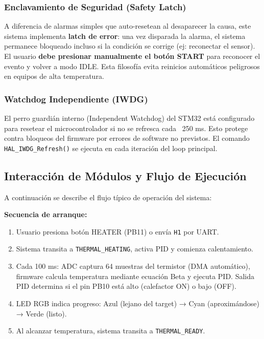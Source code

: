 \documentclass[12pt]{article}
\begin{document}
\subsubsection{Enclavamiento de Seguridad (Safety Latch)}
A diferencia de alarmas simples que auto-resetean al desaparecer la causa, este sistema implementa \textbf{latch de error}: una vez disparada la alarma, el sistema permanece bloqueado incluso si la condición se corrige (ej: reconectar el sensor). El usuario \textbf{debe presionar manualmente el botón START} para reconocer el evento y volver a modo IDLE. Esta filosofía evita reinicios automáticos peligrosos en equipos de alta temperatura.

\subsubsection{Watchdog Independiente (IWDG)}
El perro guardián interno (Independent Watchdog) del STM32 está configurado para resetear el microcontrolador si no se refresca cada ~250 ms. Esto protege contra bloqueos del firmware por errores de software no previstos. El comando \texttt{HAL\_IWDG\_Refresh()} se ejecuta en cada iteración del loop principal.

\subsection{Interacción de Módulos y Flujo de Ejecución}
A continuación se describe el flujo típico de operación del sistema:

\textbf{Secuencia de arranque:}
\begin{enumerate}
    \item Usuario presiona botón HEATER (PB11) o envía \texttt{H1} por UART.
    \item Sistema transita a \texttt{THERMAL\_HEATING}, activa PID y comienza calentamiento.
    \item Cada 100 ms: ADC captura 64 muestras del termistor (DMA automático), firmware calcula temperatura mediante ecuación Beta y ejecuta PID. Salida PID determina si el pin PB10 está alto (calefactor ON) o bajo (OFF).
    \item LED RGB indica progreso: Azul (lejano del target) → Cyan (aproximándose) → Verde (listo).
    \item Al alcanzar temperatura, sistema transita a \texttt{THERMAL\_READY}.
\end{enumerate}
\end{document}
